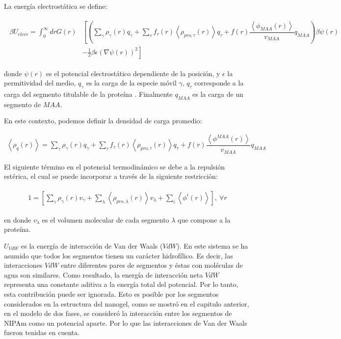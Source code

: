 La energ\'ia electrost\'atica se define:

\begin{align}
	\begin{aligned}
		\beta U_{elecc}= \int_0^\infty drG(r)&\left[\left(\sum_{\gamma } {\rho_\gamma(r) q_\gamma + \sum_\tau{f_\tau(r) \left<\rho_{pro,\tau}(r)\right> q_\tau} +  f(r)\dfrac{\left<\phi_{MAA}(r)\right>}{v_{MAA}}q_{MAA}}\right)\beta\psi(r) \right. \\ &\left.-\frac{1}{2}\beta\epsilon(\nabla\psi(r))^2 \right]
	\end{aligned}
\end{align} 

\noindent donde $\psi(r)$ es el potencial electrost\'atico dependiente de la posici\'on, y $\epsilon$ la permitividad del medio, $q_\gamma$ es la carga de la especie m\'ovil $\gamma$, $q_\tau$ corresponde a la carga del segmento titulable de la prote\'ina . Finalmente $q_{MAA}$ es la carga de un segmento de $MAA$.

En este contexto, podemos definir la densidad de carga promedio: 

\begin{align}
	\left<\rho_q(r)\right> = \sum_{\gamma } {\rho_\gamma(r) q_\gamma + \sum_\tau{f_\tau(r) \left<\rho_{pro,\tau}(r)\right> q_\tau} +  f(r)\dfrac{\left<\phi^{MAA}(r)\right>}{v_{MAA}}q_{MAA}}
	\label{eq:esf:rho-charge}
\end{align}  
             
El siguiente t\'ermino en el potencial termodin\'amico se debe a la repulsi\'on est\'erica, el cual se puede incorporar a trav\'es de la siguiente restricci\'on:

\begin{align}
	\begin{aligned}
		1=  {\left[\sum_{\gamma}\rho_\gamma(r) v_\gamma + \sum_\lambda{\left<\rho_{pro,\lambda}(r)\right>v_\lambda} + \sum_i{\left<\phi^i(r)\right>}\right]},~ \forall r
	\end{aligned}
	\label{eq:esf:constraint}
\end{align}


\noindent en donde $v_\lambda$  es el volumen molecular de cada segmento $\lambda$  que compone a la prote\'ina.



$U_{VdW}$ es la energ\'ia de interacci\'on de Van der Waals ($VdW$). En este sistema se ha asumido que todos los segmentos tienen un car\'acter hidrof\'ilico. Es decir, las interacciones $VdW$ entre diferentes pares de segmentos y \'estas con mol\'eculas de agua son similares. Como resultado, la energ\'ia de interacci\'on neta $VdW$ representa una constante aditiva a la energ\'ia total del potencial.
Por lo tanto, esta contribuci\'on puede ser ignorada. 
Esto es posible por los segmentos considerados en la estructura del nanogel, como se mostr\'o en el capitulo anterior, en el modelo de dos fases, se consider\'o la interacci\'on entre los segmentos de NIPAm como un potencial aparte. Por lo que las interacciones de Van der Waals fueron tenidas en cuenta.



